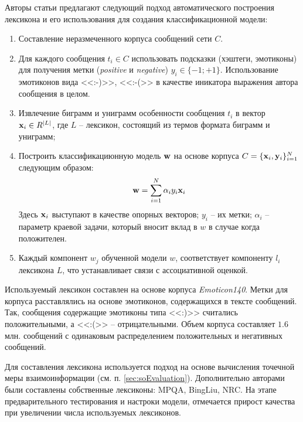     Авторы статьи предлагают следующий подход автоматического построения
    лексикона и его использования для создания классификационной модели:
    \begin{enumerate}
        \item Составление неразмеченного корпуса сообщений сети \twitter $C$.
        \item Для каждого сообщения $t_i \in C$ использовать подсказки
            (хэштеги, эмотиконы) для получения метки ({\it positive} и {\it negative})
            $y_i \in \{-1; +1\}$. Использование эмотиконов вида <<:-)>>, <<:-(>>
            в качестве иникатора выражения автора сообщения в целом.
        \item Извлечение биграмм и униграмм особенности сообщения $t_i$ в
            вектор ${\bf x}_i \in R^{|L|}$, где $L$ -- лексикон, состоящий из
            термов формата биграмм и униграмм;
        \item Построить классификациюнную модель ${\bf w}$ на основе корпуса
            $C = \{{\bf x}_i, {\bf y}_i \}_{i=1}^{N}$ следующим образом:
        \begin{equation}
            {\bf w} = \sum\limits_{i=1}^{N}\alpha_i y_i {\bf x}_i
        \end{equation}
        Здесь ${\bf x}_i$ выступают в качестве опорных векторов; $y_i$ -- их метки;
        $\alpha_i$ -- параметр краевой задачи, который вносит вклад в
        $w$ в случае когда положителен.
        \item Каждый компонент $w_j$ обученной модели $w$, соответствует компоненту $l_i$
            лексикона $L$, что устанавливает связи с ассоциативной оценкой.
    \end{enumerate}

    Используемый лексикон составлен на основе \twitter корпуса {\it Emoticon140}.
    Метки для корпуса расставлялись на основе эмотиконов, содержащихся в
    тексте сообщений.
    Так, сообщения содержащие эмотиконы типа <<:)>> считались положительными,
    а <<:(>> -- отрицательными.
    Объем корпуса составляет $1.6$ млн. сообщений с одинаковым распределением
    положительных и негативных сообщений.

    Для составления лексикона используется подход на основе вычисления
    точечной меры взаимоинформации (см. п. \ref{sec:soEvaluation}).
    Дополнительно авторами были составлены собственные лексиконы: MPQA, BingLiu, NRC.
    На этапе предварительного тестирования и настроки модели, отмечается прирост
    качества при увеличении числа используемых лексиконов.


